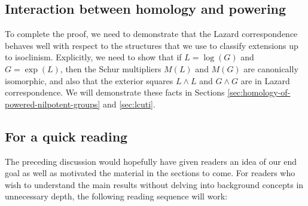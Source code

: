 \documentclass{ucetd}
\begin{document}
\subsection{Interaction between homology and powering}

To complete the proof, we need to demonstrate that the Lazard
correspondence behaves well with respect to the structures that we use
to classify extensions up to isoclinism. Explicitly, we need to show
that if $L = \log(G)$ and $G = \exp(L)$, then the Schur multipliers
$M(L)$ and $M(G)$ are canonically isomorphic, and also that the
exterior squares $L \wedge L$ and $G \wedge G$ are in Lazard
correspondence.  We will demonstrate these facts in Sections
\ref{sec:homology-of-powered-nilpotent-groups} and \ref{sec:lcuti}.

\subsection{For a quick reading}

The preceding discussion would hopefully have given readers an idea of
our end goal as well as motivated the material in the sections to
come. For readers who wish to understand the main results without
delving into background concepts in unnecessary depth, the following
reading sequence will work:
\end{document}
